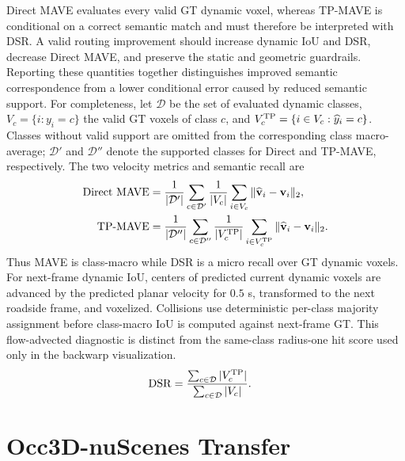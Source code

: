Direct MAVE evaluates every valid GT dynamic voxel, whereas TP-MAVE is
conditional on a correct semantic match and must therefore be interpreted with
DSR. A valid routing improvement should increase dynamic IoU and DSR, decrease
Direct MAVE, and preserve the static and geometric guardrails. Reporting these
quantities together distinguishes improved semantic correspondence from a lower
conditional error caused by reduced semantic support.
For completeness, let $\mathcal D$ be the set of evaluated dynamic classes,
$V_c=\{i:y_i=c\}$ the valid GT voxels of class $c$, and
$V_c^{\rm TP}=\{i\in V_c:\widehat y_i=c\}$. Classes without valid support are
omitted from the corresponding class macro-average; $\mathcal D'$ and
$\mathcal D''$ denote the supported classes for Direct and TP-MAVE,
respectively. The two velocity metrics and semantic recall are
\begin{align}
 \mathrm{Direct\ MAVE}
 &=\frac{1}{|\mathcal D'|}\sum_{c\in\mathcal D'}
   \frac{1}{|V_c|}\sum_{i\in V_c}
   \|\widehat{\mathbf v}_i-\mathbf v_i\|_2,\\
 \mathrm{TP\mbox{-}MAVE}
 &=\frac{1}{|\mathcal D''|}\sum_{c\in\mathcal D''}
   \frac{1}{|V_c^{\rm TP}|}\sum_{i\in V_c^{\rm TP}}
   \|\widehat{\mathbf v}_i-\mathbf v_i\|_2.
\end{align}
Thus MAVE is class-macro while DSR is a micro recall over GT dynamic voxels.
For next-frame dynamic IoU, centers of predicted current dynamic voxels are
advanced by the predicted planar velocity for $0.5$ s, transformed to the next
roadside frame, and voxelized. Collisions use deterministic per-class majority
assignment before class-macro IoU is computed against next-frame GT. This
flow-advected diagnostic is distinct from the same-class radius-one hit score
used only in the backwarp visualization.
\begin{align}
\mathrm{DSR}
&=\frac{\sum_{c\in\mathcal D}|V_c^{\rm TP}|}
        {\sum_{c\in\mathcal D}|V_c|}.
\end{align}



\section{Occ3D-nuScenes Transfer}
\label{sec:occ3d_nuscenes}

